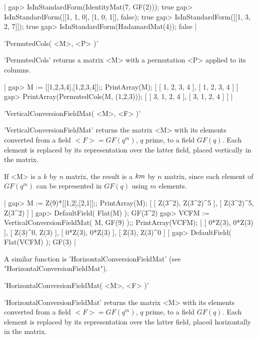 |    gap> IsInStandardForm(IdentityMat(7, GF(2)));
    true
    gap> IsInStandardForm([[1, 1, 0], [1, 0, 1]], false);
    true
    gap> IsInStandardForm([[1, 3, 2, 7]]);
    true
    gap> IsInStandardForm(HadamardMat(4));
    false |


'PermutedCols( <M>, <P> )'

'PermutedCols' returns a matrix <M> with a permutation <P> applied to its
columns.

|    gap> M := [[1,2,3,4],[1,2,3,4]];; PrintArray(M);
    [ [  1,  2,  3,  4 ],
      [  1,  2,  3,  4 ] ]
    gap> PrintArray(PermutedCols(M, (1,2,3)));
    [ [  3,  1,  2,  4 ],
      [  3,  1,  2,  4 ] ] |


'VerticalConversionFieldMat( <M>, <F> )'

'VerticalConversionFieldMat'  returns the matrix   <M> with  its elements
converted from a field $<F>=GF(q^m)$, $q$ prime, to a field $GF(q)$. Each
element is  replaced by its  representation over the latter field, placed
vertically in the matrix.

If <M>  is a $k$ by  $n$ matrix, the result is   a $k\*m$ by  $n$ matrix,
since each element of $GF(q^m)$  can be represented  in $GF(q)$ using $m$
elements.

|    gap> M := Z(9)*[[1,2],[2,1]];; PrintArray(M);
    [ [    Z(3^2),  Z(3^2)^5 ],
      [  Z(3^2)^5,    Z(3^2) ] ]
    gap> DefaultField( Flat(M) );
    GF(3^2)
    gap> VCFM := VerticalConversionFieldMat( M, GF(9) );; PrintArray(VCFM);
    [ [  0*Z(3),  0*Z(3) ],
      [  Z(3)^0,    Z(3) ],
      [  0*Z(3),  0*Z(3) ],
      [    Z(3),  Z(3)^0 ] ]
    gap> DefaultField( Flat(VCFM) );
    GF(3) |

A similar function is 'HorizontalConversionFieldMat' (see
"HorizontalConversionFieldMat").


'HorizontalConversionFieldMat( <M>, <F> )'

'HorizontalConversionFieldMat'  returns the matrix  <M> with its elements
converted from a field $<F>=GF(q^m)$, $q$ prime, to a field $GF(q)$. Each
element  is replaced by its  representation over the latter field, placed
horizontally in the matrix.

